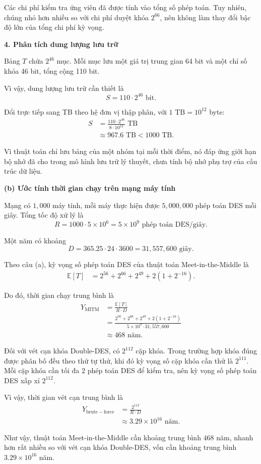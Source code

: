 \begin{loigiai}
Các chi phí kiểm tra ứng viên đã được tính vào tổng số phép toán.
Tuy nhiên, chúng nhỏ hơn nhiều so với chi phí duyệt khóa $2^{66}$,
nên không làm thay đổi bậc độ lớn của tổng chi phí kỳ vọng.

\textbf{4. Phân tích dung lượng lưu trữ}

Bảng $T$ chứa $2^{46}$ mục. Mỗi mục lưu một giá trị trung
gian 64 bit và một chỉ số khóa 46 bit, tổng cộng 110 bit.

Vì vậy, dung lượng lưu trữ cần thiết là
\[
S=110\cdot 2^{46}\text{ bit}.
\]

Đổi trực tiếp sang TB theo hệ đơn vị thập phân,
với $1\text{ TB}=10^{12}$ byte:
\[
\begin{aligned}
S
&=\frac{110\cdot 2^{46}}{8\cdot 10^{12}}\text{ TB}\\
&\approx \boxed{967.6\text{ TB}<1000\text{ TB}}.
\end{aligned}
\]

Vì thuật toán chỉ lưu bảng của một nhóm tại mỗi thời điểm,
nó đáp ứng giới hạn bộ nhớ đã cho trong mô hình lưu trữ
lý thuyết, chưa tính bộ nhớ phụ trợ của cấu trúc dữ liệu.

\textbf{(b) Ước tính thời gian chạy trên mạng máy tính}

Mạng có $1{,}000$ máy tính, mỗi máy thực hiện được
$5{,}000{,}000$ phép toán DES mỗi giây. Tổng tốc độ xử lý là
\[
R=1000\cdot5\times10^6
=5\times10^9\text{ phép toán DES/giây}.
\]

Một năm có khoảng
\[
D=365.25\cdot24\cdot3600
=31{,}557{,}600\text{ giây}.
\]

Theo câu (a), kỳ vọng số phép toán DES của thuật toán
Meet-in-the-Middle là
\[
\begin{aligned}
\mathbb{E}[T]
&=2^{56}+2^{66}+2^{49}+2(1+2^{-16}).
\end{aligned}
\]

Do đó, thời gian chạy trung bình là
\[
\begin{aligned}
Y_{\mathrm{MITM}}
&=\frac{\mathbb{E}[T]}{R\cdot D}\\
&=\frac{2^{56}+2^{66}+2^{49}+2(1+2^{-16})}
{5\times10^9\cdot31{,}557{,}600}\\
&\approx\boxed{468\text{ năm}}.
\end{aligned}
\]

Đối với vét cạn khóa Double-DES, có $2^{112}$ cặp khóa.
Trong trường hợp khóa đúng được phân bố đều theo thứ tự thử,
khi đó kỳ vọng số cặp khóa cần thử là $2^{111}$. Mỗi cặp khóa
cần tối đa $2$ phép toán DES để kiểm tra, nên kỳ vọng số phép toán
DES xấp xỉ $2^{112}$.

Vì vậy,  thời gian vét cạn trung bình là
\[
\begin{aligned}
Y_{\mathrm{brute-force}}
&=\frac{2^{112}}{R\cdot D}\\
&\approx\boxed{3.29\times10^{16}\text{ năm}}.
\end{aligned}
\]

Như vậy, thuật toán Meet-in-the-Middle cần khoảng trung bình $468$ năm,
nhanh hơn rất nhiều so với vét cạn khóa Double-DES, vốn cần
khoảng trung bình $3.29\times10^{16}$ năm.

\end{loigiai}
